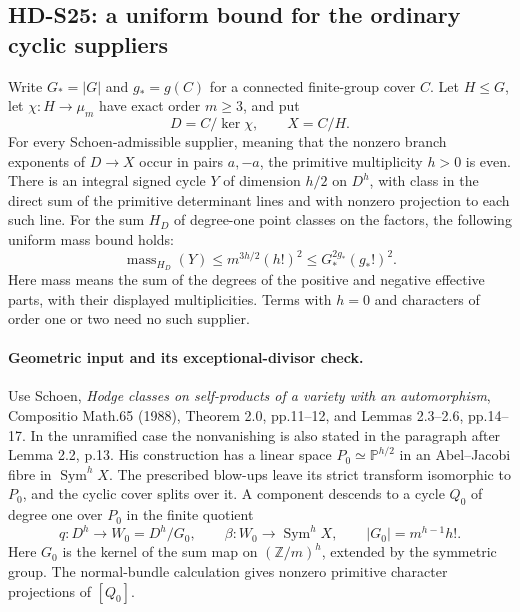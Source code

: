 \subsection{HD-S25: a uniform bound for the ordinary cyclic suppliers}

Write \(G_*=|G|\) and \(g_*=g(C)\) for a connected finite-group
cover \(C\). Let \(H\le G\), let \(\chi:H\to\mu_m\) have exact
order \(m\ge3\), and put
\[
 D=C/\ker\chi,\qquad X=C/H.
\]
For every Schoen-admissible supplier, meaning that the nonzero branch
exponents of \(D\to X\) occur in pairs \(a,-a\), the primitive
multiplicity \(h>0\) is even. There is an integral signed cycle
\(Y\) of dimension \(h/2\) on \(D^h\), with class in the direct
sum of the primitive determinant lines and with nonzero projection to
each such line. For the sum \(H_D\) of degree-one point classes on
the factors, the following uniform mass bound holds:
\begin{equation}\label{eq:S25-ordinary-bound}
 \operatorname{mass}_{H_D}(Y)
 \le m^{3h/2}(h!)^2
 \le G_*^{2g_*}(g_*!)^2.
\end{equation}
Here mass means the sum of the degrees of the positive and negative
effective parts, with their displayed multiplicities. Terms with
\(h=0\) and characters of order one or two need no such supplier.

\paragraph{Geometric input and its exceptional-divisor check.}
Use Schoen, \emph{Hodge classes on self-products of a variety with an
automorphism}, Compositio Math.65 (1988), Theorem 2.0, pp.11--12,
and Lemmas 2.3--2.6, pp.14--17. In the unramified case the
nonvanishing is also stated in the paragraph after Lemma 2.2, p.13.
His construction has a linear space
\(P_0\simeq\mathbb P^{h/2}\) in an Abel--Jacobi fibre in
\(\operatorname{Sym}^hX\). The prescribed blow-ups leave its strict
transform isomorphic to \(P_0\), and the cyclic cover splits over it.
A component descends to a cycle \(Q_0\) of degree one over \(P_0\)
in the finite quotient
\[
 q:D^h\longrightarrow W_0=D^h/G_0,
 \qquad \beta:W_0\longrightarrow\operatorname{Sym}^hX,
 \qquad |G_0|=m^{h-1}h!.
\]
Here \(G_0\) is the kernel of the sum map on \((\mathbb Z/m)^h\),
extended by the symmetric group. The normal-bundle calculation gives
nonzero primitive character projections of \([Q_0]\).

